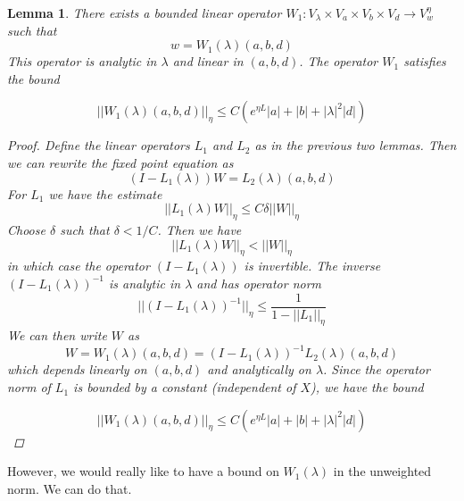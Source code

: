 \documentclass[12pt]{article}
\newtheorem{lemma}{Lemma}
\begin{document}
\begin{lemma}\label{W1}
There exists a bounded linear operator $W_1: V_\lambda \times V_a \times V_b \times V_d \rightarrow V_w^\eta$ such that 
\[
w = W_1(\lambda)(a,b,d)
\]
This operator is analytic in $\lambda$ and linear in $(a, b, d)$. The operator $W_1$ satisfies the bound

\[
||W_1(\lambda)(a,b,d)||_\eta \leq C ( e^{\eta L}|a| + |b| + |\lambda|^2 |d|)
\]

\begin{proof}
Define the linear operators $L_1$ and $L_2$ as in the previous two lemmas. Then we can rewrite the fixed point equation as
\[
(I - L_1(\lambda))W = L_2(\lambda)(a,b,d)
\]
For $L_1$ we have the estimate
\[
||L_1(\lambda)W||_\eta \leq C \delta ||W||_\eta
\]
Choose $\delta$ such that $\delta < 1/C$. Then we have
\[
||L_1(\lambda)W||_\eta < ||W||_\eta
\]
in which case the operator $(I - L_1(\lambda))$ is invertible. The inverse $(I - L_1(\lambda))^{-1}$ is analytic in $\lambda$ and has operator norm 
\[
||(I - L_1(\lambda))^{-1}||_\eta \leq \frac{1}{1 - ||L_1||_\eta}
\]
We can then write $W$ as
\[
W = W_1(\lambda)(a,b,d) = (I - L_1(\lambda))^{-1} L_2(\lambda)(a,b,d)
\]
which depends linearly on $(a,b,d)$ and analytically on $\lambda$. Since the operator norm of $L_1$ is bounded by a constant (independent of $X$), we have the bound

\[
||W_1(\lambda)(a,b,d)||_\eta \leq C ( e^{\eta L}|a| + |b| + |\lambda|^2 |d|)
\]

\end{proof}
\end{lemma}

However, we would really like to have a bound on $W_1(\lambda)$ in the unweighted norm. We can do that.
\end{document}
